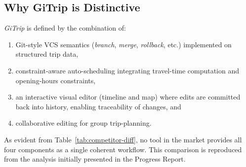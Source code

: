 \subsection{Why GiTrip is Distinctive}
\label{sec:uniqueness}
\textit{GiTrip} is defined by the combination of:
\begin{enumerate}[label=\alph*)]
    \item Git-style VCS semantics (\textit{branch}, \textit{merge}, \textit{rollback}, etc.) implemented on structured trip data,
    \item constraint-aware auto-scheduling integrating travel-time computation and opening-hours constraints,
    \item an interactive visual editor (timeline and map) where edits are committed back into history, enabling traceability of changes, and 
    \item collaborative editing for group trip-planning.
\end{enumerate}
As evident from Table~\ref{tab:competitor-diff}, no tool in the market provides
all four components as a single coherent workflow. This comparison is reproduced
from the analysis initially presented in the Progress Report.


